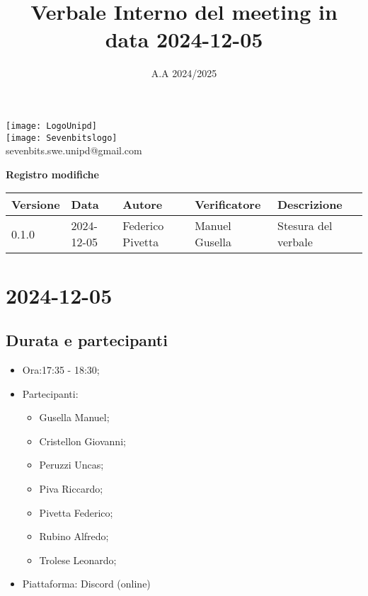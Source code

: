 \documentclass[10pt]{article}
\title{Verbale Interno del meeting in data 2024-12-05}
\date{A.A 2024/2025}
\begin{document}
\maketitle
\begin{center}
\texttt{[image: LogoUnipd]}\\
\texttt{[image: Sevenbitslogo]}\\
sevenbits.swe.unipd@gmail.com\\
\vspace{2mm}

\textbf{Registro modifiche}\\
\vspace{2mm}
\begin{tabularx}{\textwidth}{|l|l|l|l|X|}
\hline
\textbf{Versione} & \textbf{Data} & \textbf{Autore} & \textbf{Verificatore} & \textbf{Descrizione} \\
\hline
0.1.0 & 2024-12-05 & Federico Pivetta & Manuel Gusella & Stesura del verbale\\
\hline
\end{tabularx}
\end{center}

\newpage
\tableofcontents

\newpage
\section{2024-12-05}
\subsection{Durata e partecipanti}
\begin{itemize}
\item Ora:17:35 - 18:30;
\item Partecipanti: 	
	\begin{itemize}
	    \item Gusella Manuel;
            \item Cristellon Giovanni;
            \item Peruzzi Uncas;
            \item Piva Riccardo;
            \item Pivetta Federico;
            \item Rubino Alfredo;
            \item Trolese Leonardo;
	\end{itemize}
\item Piattaforma: Discord (online)
\end{itemize}
\end{document}
